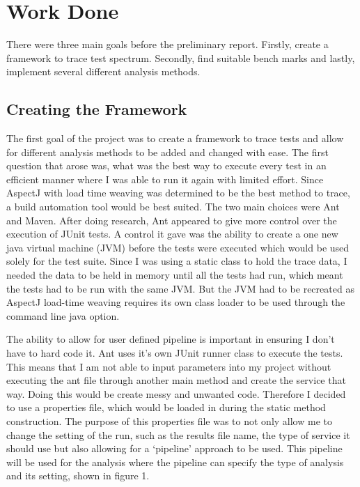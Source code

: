 \chapter{Work Done}\label{C:workdone}

There were three main goals before the preliminary report. Firstly, create a framework to trace test spectrum. Secondly, find suitable bench marks and lastly, implement several different analysis methods.

\section{Creating the Framework}

The first goal of the project was to create a framework to trace tests and allow for different analysis methods to be added and changed with ease. The first question that arose was, what was the best way to execute every test in an efficient manner where I was able to run it again with limited effort. Since AspectJ with load time weaving was determined to be the best method to trace, a build automation tool would be best suited. The two main choices were Ant and Maven. After doing research, Ant appeared to give more control over the execution of JUnit tests. A control it gave was the ability to create a one new java virtual machine (JVM) before the tests were executed which would be used solely for the test suite. Since I was using a static class to hold the trace data, I needed the data to be held in memory until all the tests had run, which meant the tests had to be run with the same JVM. But the JVM had to be recreated as AspectJ load-time weaving requires its own class loader to be used through the command line java option.

The ability to allow for user defined pipeline is important in ensuring I don't have to hard code it. Ant uses it’s own JUnit runner class to execute the tests. This means that I am not able to input parameters into my project without executing the ant file through another main method and create the service that way. Doing this would be create messy and unwanted code. Therefore I decided to use a properties file, which would be loaded in during the static method construction. The purpose of this properties file was to not only allow me to change the setting of the run, such as the results file name, the type of service it should use but also allowing for a ‘pipeline’ approach to be used. This pipeline will be used for the analysis where the pipeline can specify the type of analysis and its setting, shown in figure 1.

